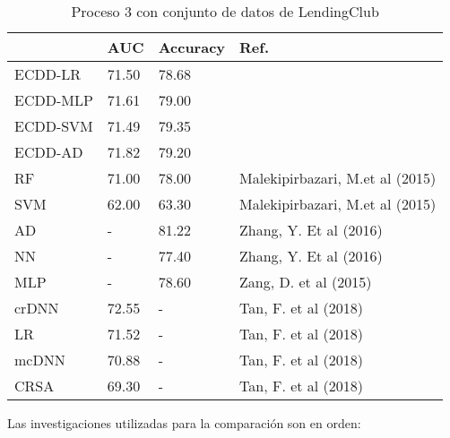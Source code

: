 \begin{table}[]
\centering
\caption{Proceso 3 con conjunto de datos de LendingClub}
\label{tab:lc-proc3}
\begin{tabularx}{\textwidth}{|l|Y Y l|}
                \hline
                & AUC           & Accuracy      & Ref.                                  \\
                \hline
ECDD-LR           & 71.50         & 78.68         &                                       \\
ECDD-MLP          & 71.61         & 79.00         &                                       \\
ECDD-SVM          & 71.49         & 79.35         &                                       \\
ECDD-AD           & 71.82         & 79.20         &                                       \\
                \hline
RF              & 71.00         & 78.00         & Malekipirbazari, M.et al (2015)       \\
SVM             & 62.00         & 63.30         & Malekipirbazari, M.et al (2015)       \\
AD              & -             & 81.22         & Zhang, Y. Et al (2016)                \\
NN              & -             & 77.40         & Zhang, Y. Et al (2016)                \\
MLP             & -             & 78.60         & Zang, D. et al (2015)                 \\
crDNN           & 72.55         & -             & Tan, F. et al (2018)                  \\
LR              & 71.52         & -             & Tan, F. et al (2018)                  \\
mcDNN           & 70.88         & -             & Tan, F. et al (2018)                  \\
CRSA            & 69.30         & -             & Tan, F. et al (2018)                  \\
                \hline
\end{tabularx}
\par
\small
Las investigaciones utilizadas para la comparación son en orden: \cite{malekipirbazari2015risk, zhang2016research, zang2014credit, tan2018deep}
\end{table}


